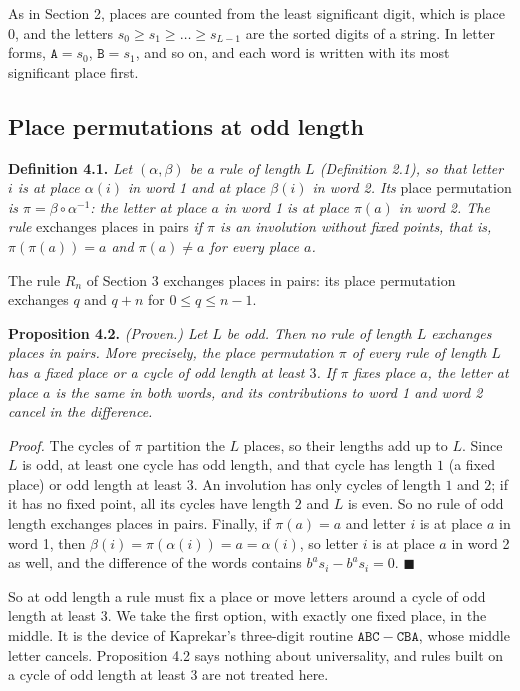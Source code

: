 \documentclass[11pt,letterpaper]{article}
\theoremstyle{paperstyle}
\theoremstyle{paperstyledef}
\theoremstyle{paperstylerem}
\begin{document}
As in Section 2, places are counted from the least significant digit, which is place \(0\), and the letters \(s_0 \geq s_1 \geq \dots \geq s_{L-1}\) are the sorted digits of a string. In letter forms, \(\mathtt{A} = s_0\), \(\mathtt{B} = s_1\), and so on, and each word is written with its most significant place first.

\subsection{Place permutations at odd length}\label{place-permutations-at-odd-length}

\textbf{Definition 4.1.} \emph{Let \((\alpha, \beta)\) be a rule of length \(L\) (Definition 2.1), so that letter \(i\) is at place \(\alpha(i)\) in word 1 and at place \(\beta(i)\) in word 2. Its} place permutation \emph{is \(\pi = \beta \circ \alpha^{-1}\): the letter at place \(a\) in word 1 is at place \(\pi(a)\) in word 2. The rule} exchanges places in pairs \emph{if \(\pi\) is an involution without fixed points, that is, \(\pi(\pi(a)) = a\) and \(\pi(a) \neq a\) for every place \(a\).}

The rule \(R_n\) of Section 3 exchanges places in pairs: its place permutation exchanges \(q\) and \(q+n\) for \(0 \leq q \leq n-1\).

\textbf{Proposition 4.2.} \emph{(Proven.) Let \(L\) be odd. Then no rule of length \(L\) exchanges places in pairs. More precisely, the place permutation \(\pi\) of every rule of length \(L\) has a fixed place or a cycle of odd length at least \(3\). If \(\pi\) fixes place \(a\), the letter at place \(a\) is the same in both words, and its contributions to word 1 and word 2 cancel in the difference.}

\emph{Proof.} The cycles of \(\pi\) partition the \(L\) places, so their lengths add up to \(L\). Since \(L\) is odd, at least one cycle has odd length, and that cycle has length \(1\) (a fixed place) or odd length at least \(3\). An involution has only cycles of length \(1\) and \(2\); if it has no fixed point, all its cycles have length \(2\) and \(L\) is even. So no rule of odd length exchanges places in pairs. Finally, if \(\pi(a) = a\) and letter \(i\) is at place \(a\) in word 1, then \(\beta(i) = \pi(\alpha(i)) = a = \alpha(i)\), so letter \(i\) is at place \(a\) in word 2 as well, and the difference of the words contains \(b^a s_i - b^a s_i = 0\). \(\blacksquare\)

So at odd length a rule must fix a place or move letters around a cycle of odd length at least \(3\). We take the first option, with exactly one fixed place, in the middle. It is the device of Kaprekar's three-digit routine \(\mathtt{ABC} - \mathtt{CBA}\), whose middle letter cancels. Proposition 4.2 says nothing about universality, and rules built on a cycle of odd length at least \(3\) are not treated here.
\end{document}
